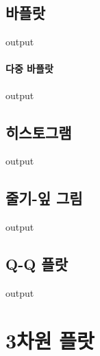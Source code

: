 \documentclass{book}
\begin{document}
\subsection{바플랏}
\begin{Schunk}
\begin{Soutput}
output
\end{Soutput}
\end{Schunk}
\paragraph{다중 바플랏}
\begin{Schunk}
\begin{Soutput}
output
\end{Soutput}
\end{Schunk}
\subsection{히스토그램}
\begin{Schunk}
\begin{Soutput}
output
\end{Soutput}
\end{Schunk}
\subsection{줄기-잎 그림}
\begin{Schunk}
\begin{Soutput}
output
\end{Soutput}
\end{Schunk}
\subsection{Q-Q 플랏}
\begin{Schunk}
\begin{Soutput}
output
\end{Soutput}
\end{Schunk}

\section{3차원 플랏}
\end{document}
